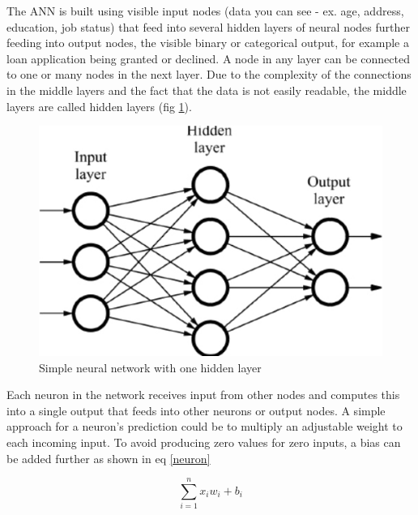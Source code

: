 \documentclass[proposal]{softeng}
\begin{document}
The ANN is built using visible input nodes (data you can see - ex. age, address, education, job status) that feed into several hidden layers of neural nodes further feeding into output nodes, the visible binary or categorical output, for example a loan application being granted or declined. A node in any layer can be connected to one or many nodes in the next layer. Due to the complexity of the connections in the middle layers and the fact that the data is not easily readable, the middle layers are called hidden layers (fig \ref{fig:simplenetwork}).

\begin{figure}[h!]
\centering

\includegraphics[scale=0.4]{images/simple-neural-network.jpg}

\caption{Simple neural network with one hidden layer \cite{simpleneural}}

\label{fig:simplenetwork}
\end{figure}

Each neuron in the network receives input from other nodes and computes this into a single output that feeds into other neurons or output nodes. A simple approach for a neuron's prediction could be to multiply an adjustable weight to each incoming input. To avoid producing zero values for zero inputs, a bias can be added further as shown in eq  \ref{neuron}

\begin{equation}
\label{neuron}
\sum_{i=1}^{n} {x_{i}} {w_{i}} + {b_{i}}
\end{equation}
\end{document}
